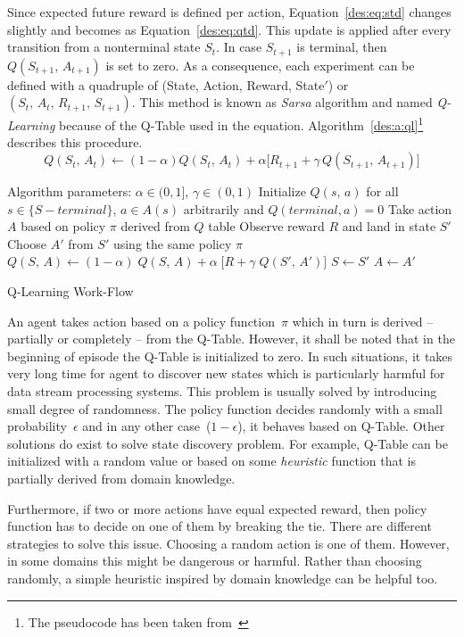 Since expected future reward is defined per action, Equation~\ref{des:eq:std} changes slightly and becomes as Equation~\ref{des:eq:qtd}. This update is applied after every transition from a nonterminal state $S_t$. In case $S_{t+1}$ is terminal, then $Q(S_{t+1},\,A_{t+1})$ is set to zero. As a consequence, each experiment can be defined with a quadruple of (State, Action, Reward, State$'$) or $(S_{t},\,A_{t},\,R_{t+1},\,S_{t+1})$. This method is known as \emph{Sarsa} algorithm and named \emph{Q-Learning} because of the Q-Table used in the equation. Algorithm~\ref{des:a:ql}\footnote{The pseudocode has been taken from~\textcite{rlIntro}} describes this procedure.
\begin{equation}
Q(S_t,\,A_t) \longleftarrow (1-\alpha)Q(S_t,\,A_t) + \alpha\big[R_{t+1} + \gamma\,Q(S_{t+1},\,A_{t+1})\big]
\label{des:eq:qtd}
\end{equation}
\begin{algorithm}[t]
	\DontPrintSemicolon
	
	Algorithm parameters: $\alpha \in (0,1]$, $\gamma \in (0,1)$\;
	Initialize $Q(s,\,a)$ for all $s \in \{S - terminal\}$, $a \in A(s)$ arbitrarily and $Q(terminal,a) = 0$\;
	\BlankLine
	 {
		Take action $A$ based on policy $\pi$ derived from $Q$ table\;
		Observe reward $R$ and land in state $S'$\;
		Choose $A'$ from $S'$ using the same policy $\pi$\;
		$Q(S,\,A) \gets (1-\alpha)\;Q(S,\,A) + \alpha\;\big[R + \gamma\;Q(S',\,A')\big]$\;
		$S \gets S'$\;
		$A \gets A'$\;
	}
	\caption{Q-Learning Work-Flow}
	\label{des:a:ql}
\end{algorithm}

An agent takes action based on a policy function~$\pi$ which in turn is derived -- partially or completely -- from the Q-Table. However, it shall be noted that in the beginning of episode the Q-Table is initialized to zero. In such situations, it takes very long time for agent to discover new states which is particularly harmful for data stream processing systems. This problem is usually solved by introducing small degree of randomness. The policy function decides randomly with a small probability~$\epsilon$ and in any other case~($1-\epsilon$), it behaves based on Q-Table. Other solutions do exist to solve state discovery problem. For example, Q-Table can be initialized with a random value or based on some \emph{heuristic} function that is partially derived from domain knowledge. 

Furthermore, if two or more actions have equal expected reward, then policy function has to decide on one of them by breaking the tie. There are different strategies to solve this issue. Choosing a random action is one of them. However, in some domains this might be dangerous or harmful. Rather than choosing randomly, a simple heuristic inspired by domain knowledge can be helpful too.
